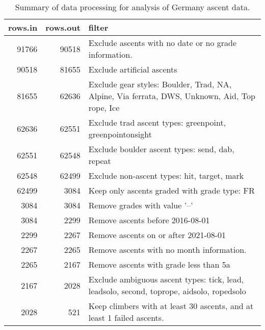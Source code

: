 \begin{table}[ht]
\centering
\begingroup\fontsize{9pt}{10pt}\selectfont
\begin{tabular}{rrl}
  \hline
{\bf rows.in} & {\bf rows.out} & {\bf filter} \\ 
  \hline
91766 & 90518 & Exclude ascents with no date or no grade information. \\ 
  90518 & 81655 & Exclude artificial ascents \\ 
  81655 & 62636 & Exclude gear styles: Boulder, Trad, NA, Alpine, Via ferrata, DWS, Unknown, Aid, Top rope, Ice \\ 
  62636 & 62551 & Exclude trad ascent types: greenpoint, greenpointonsight \\ 
  62551 & 62548 & Exclude boulder ascent types: send, dab, repeat \\ 
  62548 & 62499 & Exclude non-ascent types: hit, target, mark \\ 
  62499 & 3084 & Keep only ascents graded with grade type: FR \\ 
  3084 & 3084 & Remove grades with value '--' \\ 
  3084 & 2299 & Remove ascents before 2016-08-01 \\ 
  2299 & 2267 & Remove ascents on or after 2021-08-01 \\ 
  2267 & 2265 & Remove ascents with no month information. \\ 
  2265 & 2167 & Remove ascents with grade less than 5a \\ 
  2167 & 2028 & Exclude ambiguous ascent types: tick, lead, leadsolo, second, toprope, aidsolo, ropedsolo \\ 
  2028 & 521 & Keep climbers with at least 30 ascents, and at least 1 failed ascents. \\ 
   \hline
\end{tabular}
\endgroup
\caption{Summary of data processing for analysis of Germany ascent data.} 
\label{table-data-processing-germany}
\end{table}
